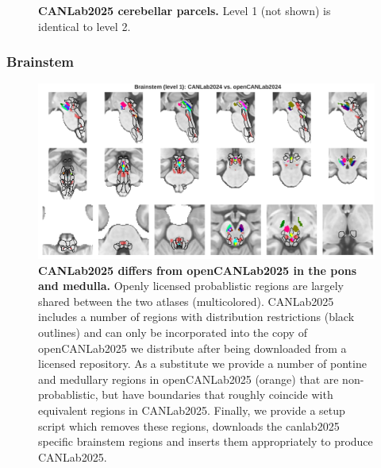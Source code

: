 \documentclass[10pt,letterpaper]{article}
\begin{document}
\begin{figure}[t]
\begin{minipage}{\linewidth}
\end{minipage}
\caption{
{\bf
CANLab2025 cerebellar parcels.} Level 1 (not shown) is identical to level 2.
}
\label{cblm-granularities-figure}
\end{figure}

\subsubsection{Brainstem}


\begin{figure}[t!]
\centering
\includegraphics[width=\linewidth]{images/bstem_canlab_vs_opencanlab.png}
\caption{
{\bf
CANLab2025 differs from openCANLab2025 in the pons and medulla.} 
Openly licensed probablistic regions are largely shared between the two atlases (multicolored). CANLab2025 includes a number of regions with distribution restrictions (black outlines) and can only be incorporated into the copy of openCANLab2025 we distribute after being downloaded from a licensed repository. As a substitute we provide a number of pontine and medullary regions in openCANLab2025 (orange) that are non-probablistic, but have boundaries that roughly coincide with equivalent regions in CANLab2025. Finally, we provide a setup script which removes these regions, downloads the canlab2025 specific brainstem regions and inserts them appropriately to produce CANLab2025.}
\label{canlab2025-vs-opencanlab2025-bstem-figure}
\end{figure}
\end{document}
